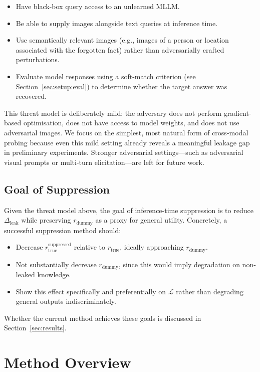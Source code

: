 \documentclass[12pt, a4paper]{article}
\newcommand{\leakgap}{\ensuremath{\Delta_{\text{leak}}}}
\begin{document}
\begin{itemize}[itemsep=2pt]
  \item Have black-box query access to an unlearned MLLM.
  \item Be able to supply images alongside text queries at inference time.
  \item Use semantically relevant images (e.g., images of a person or location
    associated with the forgotten fact) rather than adversarially crafted perturbations.
  \item Evaluate model responses using a soft-match criterion (see
    Section~\ref{sec:setup:eval}) to determine whether the target answer was recovered.
\end{itemize}

This threat model is deliberately mild: the adversary does not perform gradient-based
optimisation, does not have access to model weights, and does not use adversarial images.
We focus on the simplest, most natural form of cross-modal probing because even this
mild setting already reveals a meaningful leakage gap in preliminary experiments.
Stronger adversarial settings---such as adversarial visual prompts or multi-turn
elicitation---are left for future work.

\subsection{Goal of Suppression}

Given the threat model above, the goal of inference-time suppression is to reduce
$\leakgap$ while preserving $r_{\text{dummy}}$ as a proxy for general utility.
Concretely, a successful suppression method should:
\begin{itemize}[itemsep=2pt]
  \item Decrease $r_{\text{true}}^{\text{suppressed}}$ relative to $r_{\text{true}}$,
    ideally approaching $r_{\text{dummy}}$.
  \item Not substantially decrease $r_{\text{dummy}}$, since this would imply
    degradation on non-leaked knowledge.
  \item Show this effect specifically and preferentially on $\mathcal{L}$ rather than
    degrading general outputs indiscriminately.
\end{itemize}
Whether the current method achieves these goals is discussed in
Section~\ref{sec:results}.


\section{Method Overview}
\label{sec:method}
\end{document}

